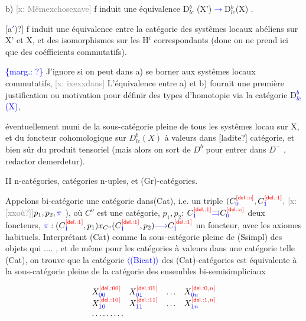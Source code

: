 \documentclass[11pt]{article}
\newcommand{\scanpage}[1]{\par\bigskip\noindent{\small\sffamily[scan #1]}\par}
\newcommand{\mspage}[1]{{\small\sffamily[p.\,#1]}}
\newcommand{\hand}[1]{\textcolor{blue}{#1}}
\newcommand{\inserted}[2][]{\textcolor{blue}{$\langle$#2$\rangle$}}
\newcommand{\margin}[1]{\textcolor{blue}{\{\textsf{marg.:} #1\}}}
\newcommand{\deleted}[1]{\textcolor{red}{[\textsf{del.:} #1]}}
\newcommand{\xout}[1]{\textcolor{gray}{[\textsf{x:} #1]}}
\newcommand{\unsure}[1]{[#1?]}
\newenvironment{diagramblock}{\par\begin{center}}{\end{center}\par}
\begin{document}
b) \xout{Mêmexchosexave} f induit une équivalence D$^b_{lc}$ (X')\hand{$\longrightarrow$}D$^b_{lc}$(X) .

\unsure{a\hand{$'$})} f induit une équivalence entre la catégorie des systêmes locaux
abéliens sur X' et X, et des isomorphismes sur les H$^i$ correspondants (donc
on ne prend ici que des coéfficients commutatifs).

\margin{?} J'ignore si on peut dans a) se borner aux systêmes locaux commutatifs,
\xout{ixexxdans}
L'équivalence entre a) et b) fournit une première justification ou
\mspage{35} motivation pour définir des types d'homotopie via la catégorie D\hand{$^b_{lc}$(X)},

\clearpage
\scanpage{162-5/36}
éventuellement muni de la sous-catégorie pleine de tous les systêmes locau
sur X, et du foncteur cohomologique sur $D^b_{lc}(X)$ à valeurs dans \unsure{ladite}
catégorie, et bien sûr du produit tensoriel (mais alors on sort de $D^b$
pour entrer dans $D^-$ , redactor demerdetur).

II n-catégories, catégories n-uples, et (Gr)-catégories.

Appelons bi-catégorie une catégorie dans(Cat), i.e. un triple
$(C^{\deleted{o}}_{\hand{0}},C^{\deleted{1}}_{\hand{1}},$ \xout{\unsure{xxoù}}$p_1,p_2,\hand{\pi}$ ), où $C^o$ est une catégorie, $p_1,p_2$: $C^{\deleted{1}}_{\hand{1}}\hand{\rightrightarrows}C^{\deleted{o}}_{\hand{0}}$ deux
foncteurs, $\hand{\pi}:(C^{\deleted{1}}_{\hand{1}},p_1)x_{C^o}(C^{\deleted{1}}_{\hand{1}},p_2)\hand{\longrightarrow}C^{\deleted{1}}_{\hand{1}}$ un foncteur, avec les axiomes
habituels. Interprétant (Cat) comme la sous-catégorie pleine de (Ssimpl)
des objets qui .... , et de même pour les catégories à valeurs dans une
catégorie telle (Cat), on trouve que la catégorie \inserted[typed]{(Bicat)} des (Cat)-catégories
est équivalente à la sous-catégorie pleine de la catégorie des ensembles
bi-semisimpliciaux

\begin{diagramblock}
\[
\begin{array}{llll}
X^{\deleted{00}}_{\hand{00}} & X^{\deleted{01}}_{\hand{01}} & \ldots & X^{\deleted{0,n}}_{\hand{0n}}\\
X^{\deleted{10}}_{\hand{10}} & X^{\deleted{11}}_{\hand{11}} & \ldots & X^{\deleted{1,n}}_{\hand{1n}}\\
\multicolumn{4}{l}{\ldots\ldots\ldots}
\end{array}
\]
\end{diagramblock}
\end{document}
